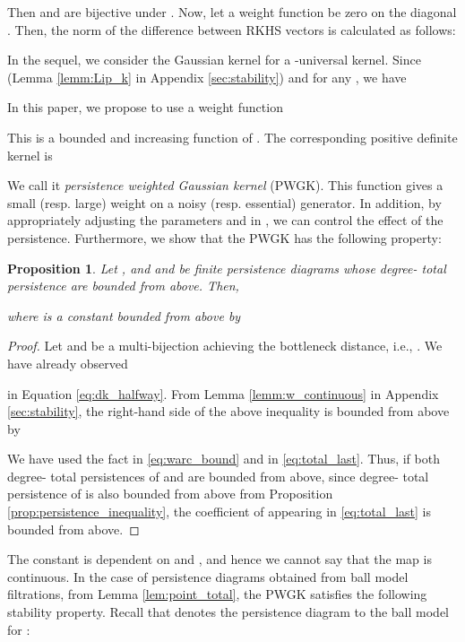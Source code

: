 \documentclass{article}
\newtheorem{prop}[thm]{Proposition}
\begin{document}
Then  and  are bijective under .
Now, let a weight function  be zero on the diagonal .
Then, the norm of the difference between RKHS vectors is calculated as follows:


In the sequel, we consider the Gaussian kernel  for a -universal kernel.
Since  (Lemma \ref{lemm:Lip_k} in Appendix \ref{sec:stability}) and  for any , we have 


In this paper, we propose to use a weight function 

This is a bounded and increasing function of .
The corresponding positive definite kernel is

We call it {\em persistence weighted Gaussian kernel} (PWGK).
This function  gives a small (resp. large) weight on a noisy (resp. essential) generator. 
In addition, by appropriately adjusting the parameters  and  in , we can control the effect of the persistence.  
Furthermore, we show that the PWGK has the following property: 

\begin{prop}
\label{prop:general_stability}
Let , and  and  be finite persistence diagrams whose degree- total persistence are bounded from above.
Then,

where  is a constant bounded from above by

\end{prop}

\begin{proof}
Let  and  be a multi-bijection achieving the bottleneck distance, i.e., . We have already observed 

in Equation \eqref{eq:dk_halfway}. 
From Lemma \ref{lemm:w_continuous} in Appendix \ref{sec:stability}, the right-hand side of the above inequality is bounded from above by

We have used the fact  in \eqref{eq:warc_bound} and  in \eqref{eq:total_last}.
Thus, if both degree- total persistences of  and  are bounded from above, since degree- total persistence of  is also bounded from above from Proposition \ref{prop:persistence_inequality}, the coefficient of  appearing in \eqref{eq:total_last} is bounded from above.
\end{proof}

The constant  is dependent on  and , and hence we cannot say that the map  is continuous.
In the case of persistence diagrams obtained from ball model filtrations, from Lemma \ref{lem:point_total}, the PWGK satisfies the following stability property.
Recall that  denotes the persistence diagram to the ball model for :
\end{document}
